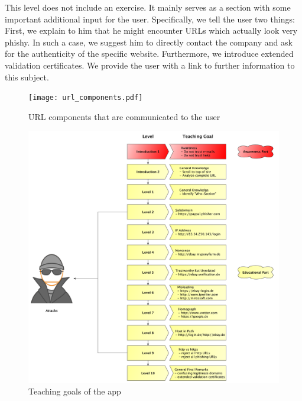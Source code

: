 \begin{description}[leftmargin=0cm]
	\item[Level 10] This level does not include an exercise.
 It mainly serves as a section with some important additional input for the user.
 Specifically, we tell the user two things: First, we explain to him that he might encounter URLs which actually look very phishy.
 In such a case, we suggest him to directly contact the company and ask for the authenticity of the specific website.
 Furthermore, we introduce extended validation certificates.
 We provide the user with a link to further information to this subject.

\end{description}

\begin{figure}[hHtbp]
\centering
\texttt{[image: url\_components.pdf]}
\caption{URL components that are communicated to the user}
\label{fig:url_components}
\end{figure}

\begin{figure}[hHtbp]
\centering
\includegraphics[width=1.0\textwidth]{graphix/level_teaching_goals.pdf}
\caption{Teaching goals of the app}
\label{fig:level_teaching_goals}
\end{figure}


